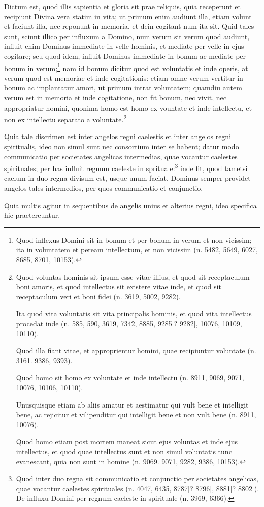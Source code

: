 \begin{topic}{26}
    Dictum est, quod illis sapientia et gloria sit prae reliquis, quia receperunt et recipiunt Divina vera statim in
    vita; ut primum enim audiunt illa, etiam volunt et faciunt illa, nec reponunt in memoria, et dein cogitant num ita
    sit.
    Quid tales sunt, sciunt illico per influxum a Domino, num verum sit verum quod audiunt, influit enim Dominus
    immediate in velle hominis, et mediate per velle in ejus cogitare; seu quod idem, influit Dominus immediate in bonum
    ac mediate per bonum in verum;\footnote{Quod inflexus Domini sit in bonum et per bonum in verum et non vicissim; ita
    in voluntatem et peream intellectum, et non vicissim (n. 5482, 5649, 6027, 8685, 8701, 10153).} nam id bonum dicitur
    quod est voluntatis et inde operis, at verum quod est memoriae et inde cogitationis: etiam omne verum vertitur in
    bonum ac implantatur amori, ut primum intrat voluntatem; quamdiu autem verum est in memoria et inde cogitatione, non
    fit bonum, nec vivit, nec appropriatur homini, quonima homo est homo ex vountate et inde intellectu, et non ex
    intellectu separato a voluntate.\footnote{Quod voluntas hominis sit ipsum esse vitae illius, et quod sit
    receptaculum boni amoris, et quod intellectus sit existere vitae inde, et quod sit receptaculum veri et boni fidei
    (n. 3619, 5002, 9282).

    Ita quod vita voluntatis sit vita principalis hominis, et quod vita intellectus procedat inde (n. 585, 590, 3619,
    7342, 8885, 9285[? 9282], 10076, 10109, 10110).

    Quod illa fiant vitae, et approprientur homini, quae recipiuntur voluntate (n. 3161. 9386, 9393).

    Quod homo sit homo ex voluntate et inde intellectu (n. 8911, 9069, 9071, 10076, 10106, 10110).

    Unusquisque etiam ab aliis amatur et aestimatur qui vult bene et intelligit bene, ac rejicitur et vilipenditur qui
    intelligit bene et non vult bene (n. 8911, 10076).

    Quod homo etiam post mortem maneat sicut ejus voluntas et inde ejus intellectus, et quod quae intellectus sunt et
    non simul voluntatis tunc evanescant, quia non sunt in homine (n. 9069. 9071, 9282, 9386, 10153).}
\end{topic}

\begin{topic}{27}
    Quia tale discrimen est inter angelos regni caelestis et inter angelos regni spiritualis, ideo non simul sunt nec
    consortium inter se habent; datur modo communicatio per societates angelicas intermedias, quae vocantur caelestes
    spirituales; per has influit regnum caeleste in sprituale:\footnote{Quod inter duo regna sit communicatio et
    conjunctio per societates angelicas, quae vocantur caelestes spirituales (n. 4047, 6435, 8787[? 8796], 8881[?
    8802]).
    De influxu Domini per regnum caeleste in spirituale (n. 3969, 6366).} inde fit, quod tametsi caelum in duo regna
    divisum est, usque unum faciat.
    Dominus semper providet angelos tales intermedios, per quos communicatio et conjunctio.
\end{topic}

\begin{topic}{28}
    Quia multis agitur in sequentibus de angelis unius et alterius regni, ideo specifica hic praetereuntur.
\end{topic}
